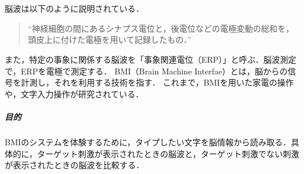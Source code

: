 \chapter{\kadaie}\label{chap:\kadaie}
\section{\purpose}
脳波は以下のように説明されている．
\begin{quote}
    ``神経細胞の間にあるシナプス電位と，後電位などの電極変動の総和を，頭皮上に付けた電極を用いて記録したもの．''
    \\\hfill\cite{自己心理学セミナー}
\end{quote}
また，特定の事象に関係する脳波を「事象関連電位（ERP）」と呼ぶ．脳波測定で，ERPを電極で測定する．
BMI（Brain Machine Interfae）とは，脳からの信号を計測し，それを利用する技術を指す\cite{脳波による実用的なBMI研究開発}．
これまで，BMIを用いた家電の操作や，文字入力操作が研究されている\cite{脳波による実用的なBMI研究開発}．
\paragraph{目的}BMIのシステムを体験するために，タイプしたい文字を脳情報から読み取る．具体的に，ターゲット刺激が表示されたときの脳波と，ターゲット刺激でない刺激が表示されたときの脳波を比較する．
\section{\method}
